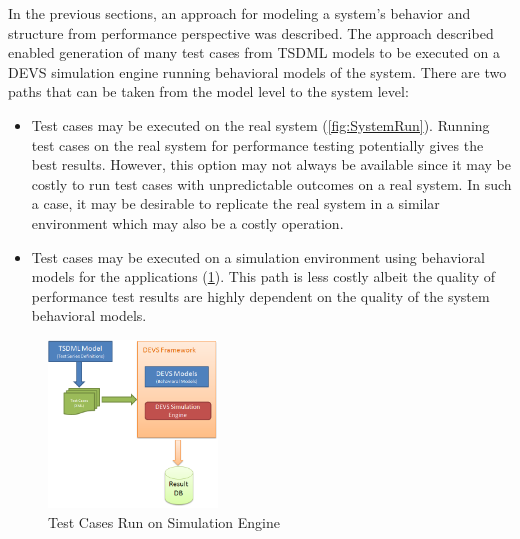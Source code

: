 In the previous sections, an approach for modeling a system's behavior and structure from performance perspective was described. The approach described enabled generation of many test cases from TSDML models to be executed on a DEVS simulation engine running behavioral models of the system. There are two paths that can be taken from the model level to the system level:

\begin{itemize}
	\item Test cases may be executed on the real system (\ref{fig:SystemRun}). Running test cases on the real system for performance testing potentially gives the best results. However, this option may not always be available since it may be costly to run test cases with unpredictable outcomes on a real system. In such a case, it may be desirable to replicate the real system in a similar environment which may also be a costly operation. 
	\item Test cases may be executed on a simulation environment using behavioral models for the applications (\ref{fig:SimulationRun}). This path is less costly albeit the quality of performance test results are highly dependent on the quality of the system behavioral models.
\end{itemize}

\begin{figure}
	\centering
		\includegraphics[width=0.40\textwidth]{figures/SimulationRun.png}
	\caption{Test Cases Run on Simulation Engine}
	\label{fig:SimulationRun}
\end{figure}

